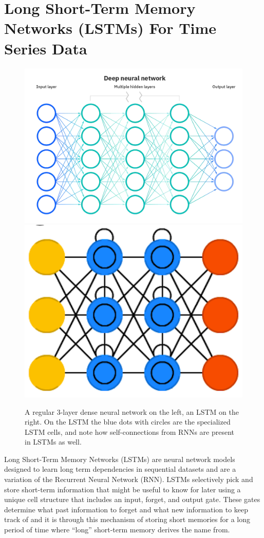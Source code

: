 \section{Long Short-Term Memory Networks (LSTMs) For Time Series Data}
\begin{figure}[H] \centering
    \includegraphics[width=0.4\linewidth]{figures/neural_network.png}
    \includegraphics[width=0.4\linewidth]{figures/lstm.png}
    \caption{A regular 3-layer dense neural network on the left, an LSTM on the right. On the LSTM the blue dots with circles are the specialized LSTM cells, and note how self-connections from RNNs are present in LSTMs as well.}
    \label{fig:neural_network_and_lstm}
\end{figure}

Long Short-Term Memory Networks (LSTMs) \cite{LSTM} are neural network models designed to learn long term dependencies in sequential datasets and are a variation of the Recurrent Neural Network (RNN). LSTMs selectively pick and store short-term information that might be useful to know for later using a unique cell structure that includes an input, forget, and output gate. These gates determine what past information to forget and what new information to keep track of and it is through this mechanism of storing short memories for a long period of time where ``long'' short-term memory derives the name from.

